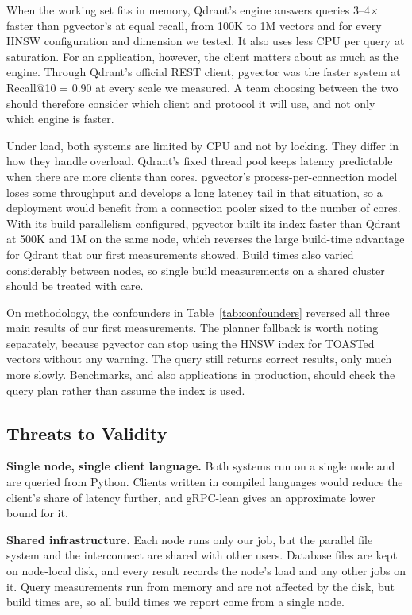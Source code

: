\documentclass[sigconf, nonacm]{acmart}
\begin{document}
When the working set fits in memory, Qdrant's engine answers queries 3--4$\times$ faster
than pgvector's at equal recall, from 100K to 1M vectors and for every HNSW configuration
and dimension we tested. It also uses less CPU per query at saturation. For an
application, however, the client matters about as much as the engine. Through Qdrant's
official REST client, pgvector was the faster system at Recall@10 = 0.90 at every scale we
measured. A team choosing between the two should therefore consider which client and
protocol it will use, and not only which engine is faster.

Under load, both systems are limited by CPU and not by locking. They differ in how they
handle overload. Qdrant's fixed thread pool keeps latency predictable when there are more
clients than cores. pgvector's process-per-connection model loses some throughput and
develops a long latency tail in that situation, so a deployment would benefit from a
connection pooler sized to the number of cores. With its build parallelism configured,
pgvector built its index faster than Qdrant at 500K and 1M on the same node, which
reverses the large build-time advantage for Qdrant that our first measurements showed.
Build times also varied considerably between nodes, so single build measurements on a
shared cluster should be treated with care.

On methodology, the confounders in Table~\ref{tab:confounders} reversed all three main
results of our first measurements. The planner fallback is worth noting separately,
because pgvector can stop using the HNSW index for TOASTed vectors without any warning.
The query still returns correct results, only much more slowly. Benchmarks, and also
applications in production, should check the query plan rather than assume the index is
used.

\subsection{Threats to Validity}

\textbf{Single node, single client language.} Both systems run on a single node and are
queried from Python. Clients written in compiled languages would reduce the client's
share of latency further, and gRPC-lean gives an approximate lower bound for it.

\textbf{Shared infrastructure.} Each node runs only our job, but the parallel file
system and the interconnect are shared with other users. Database files are kept on
node-local disk, and every result records the node's load and any other jobs on it.
Query measurements run from memory and are not affected by the disk, but build times
are, so all build times we report come from a single node.
\end{document}
